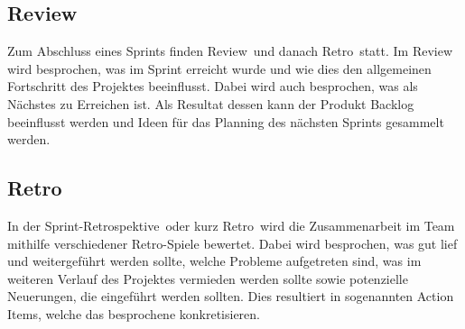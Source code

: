 \subsection{Review}
Zum Abschluss eines Sprints finden \glqq Review\grqq~und danach \glqq Retro\grqq~statt. Im Review wird besprochen, was im Sprint erreicht 
wurde und wie dies den allgemeinen Fortschritt des Projektes beeinflusst. Dabei wird auch besprochen, was als Nächstes zu Erreichen ist. 
Als Resultat dessen kann der Produkt Backlog beeinflusst werden und Ideen für das Planning des nächsten Sprints gesammelt werden. 

\subsection{Retro}
In der \glqq Sprint-Retrospektive\grqq~oder kurz \glqq Retro\grqq~wird die Zusammenarbeit im Team mithilfe verschiedener Retro-Spiele bewertet. 
Dabei wird besprochen, was gut lief und weitergeführt werden sollte, welche Probleme aufgetreten sind, was im weiteren Verlauf des Projektes 
vermieden werden sollte sowie potenzielle Neuerungen, die eingeführt werden sollten. Dies resultiert in sogenannten Action Items, welche das 
besprochene konkretisieren.

